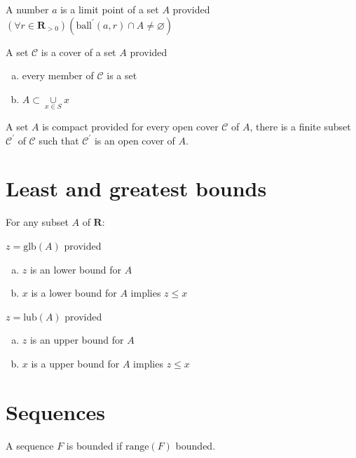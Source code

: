 \documentclass[letterpaper,landscape,9pt,fleqn]{extarticle}
\newcommand{\range}{\mathrm{range}}
\newcommand{\reals}{\mathbf{R}}
\newcommand{\ball}{\mathrm{ball}}
\newcommand{\glb}{\mathrm{glb}}
\newcommand{\lub}{\mathrm{lub}}
\newenvironment{alphalist}{
  \begin{enumerate}[(a)]
    \addtolength{\itemsep}{-1.0\itemsep}}
  {\end{enumerate}}
\begin{document}
\begin{multicols*}{3}
\begin{description}[\itemsep=0em]
    \item[Limit point] A number $a$ is a limit point of a set $A$ provided
         \( (\forall r \in \reals_{>0})(\ball^\prime(a, r) \cap A \neq \varnothing) \)

    \item[Open cover] A set $\mathcal{C}$ is a cover of a set $A$ provided 
     \begin{alphalist}
         \item every member of $\mathcal{C}$ is a set
         \item $A \subset \underset{x \in S}{\cup} x$
     \end{alphalist}

     \item[Compact] A set $A$ is compact provided for every 
     open cover $\mathcal{C}$ of $A$, there is a finite
     subset $\mathcal{C}^\prime$ of $\mathcal{C}$ such that
     $\mathcal{C}^\prime$ is an open cover of $A$.
     
    \end{description} 

\section*{Least and greatest bounds} 
For any subset $A$ of $\reals$:
\begin{description}[\itemsep=0em]
    \item[glb] $z = \glb(A)$ provided
    \begin{alphalist}
        \item $z$ is an lower bound for $A$
        \item $x$ is a lower bound for $A$ implies $z \leq x$
    \end{alphalist}
   \item[lub]  $z = \lub(A)$ provided
   \begin{alphalist}
       \item $z$ is an upper bound for $A$
       \item $x$ is a upper bound for $A$ implies $z \leq x$
   \end{alphalist}
\end{description}   
\section*{Sequences}
\begin{description}[\itemsep=0em]
\item[Bounded] A sequence $F$ is bounded if $\range(F)$ bounded.


\end{description}
\end{multicols*}
\end{document}
